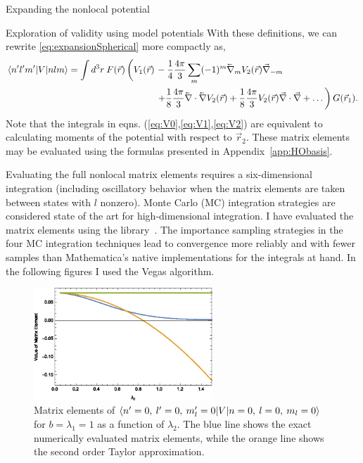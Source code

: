 \begin{section}{Expanding the nonlocal potential}
\begin{section}{Exploration of validity using model potentials \label{sec:toyModel}}
With these definitions, we can rewrite \eqref{eq:expansionSpherical} more compactly as,
\begin{equation}\label{eq:expansion2}
\begin{split}
\braket{n' l' m'| V | n l m} =  \int d^3r\: F(\vec{r})\left( \vphantom{\frac{1}{2}}V_1(\vec{r})\right.&-\frac{1}{4}\frac{4\pi}{3}\sum_m(-1)^m \lvec{\nabla}_{m}  V_2(\vec{r}) \vec{\nabla}_{-m} \\
&\left.+\frac{1}{8}\frac{4\pi}{3}\lvec{\nabla}\cdot\lvec{\nabla} V_2(\vec{r})+\frac{1}{8}\frac{4\pi}{3}V_2(\vec{r})\vec{\nabla}\cdot\vec{\nabla}+\dots\right) G(\vec{r}_1).
\end{split}
\end{equation}
Note that the integrals in eqns. (\ref{eq:V0},\ref{eq:V1},\ref{eq:V2})  are equivalent to calculating moments of the potential with respect to $\vec{r}_2$. These matrix elements may be evaluated using the formulas presented in Appendix~\ref{app:HObasis}.

Evaluating the full nonlocal matrix elements requires a six-dimensional integration (including oscillatory behavior when the matrix elements are taken between states with $l$ nonzero). Monte Carlo (MC) integration strategies are considered state of the art for high-dimensional integration. I have evaluated the matrix elements using the {} library~\cite{Hahn200578}. The importance sampling strategies in the four MC integration techniques lead to convergence more reliably and with fewer samples than Mathematica's native implementations for the integrals at hand. In the following figures I used the {\ttfamily Vegas} algorithm.

\begin{figure}[htb]
\centering \includegraphics[width=0.6\textwidth]{LocalExpansion/Figures/ToyPotential000000} 
\caption{Matrix elements of $\braket{n'=0,\: l'=0,\: m_l'=0 | V | n=0,\: l=0,\: m_l=0}$ for $b=\lambda_1=1$ as a function of $\lambda_2$. The blue line shows the exact numerically evaluated matrix elements, while the orange line shows the second order Taylor approximation.
\label{fig:gaussToy1}}
\end{figure}


\end{section}
\end{section}
